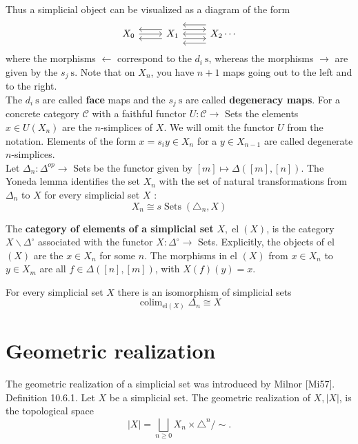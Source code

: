 Thus a simplicial object can be visualized as a diagram of the form
$$
\begin{tikzcd}
     X_0 \ar[r] \ar[r, leftarrow, shift left =2] \ar[r, leftarrow, shift right =2] & X_1 \ar[r, leftarrow] \ar[r, leftarrow, shift left =4] \ar[r, leftarrow, shift right =4] \ar[r, shift left =2] \ar[r, shift right =2] & X_2  \cdots
    \end{tikzcd}
$$
where the morphisms $\leftarrow$ correspond to the $d_i \mathrm{~s}$, whereas the morphisms $\rightarrow$ are given by the $s_j \mathrm{~s}$. Note that on $X_n$, you have $n+1$ maps going out to the left and to the right.\\
The $d_i \mathrm{~s}$ are called \textbf{face} maps and the $s_j \mathrm{~s}$ are called \textbf{degeneracy maps}.
For a concrete category $\mathcal{C}$ with a faithful functor $U: \mathcal{C} \rightarrow$ Sets the elements $x \in U\left(X_n\right)$ are the $n$-simplices of $X$. We will omit the functor $U$ from the notation. Elements of the form $x=s_i y \in X_n$ for a $y \in X_{n-1}$ are called degenerate $n$-simplices.\\

Let $\Delta_n: \Delta^{o p} \rightarrow$ Sets be the functor given by $[m] \mapsto \Delta([m],[n])$.
The Yoneda lemma identifies the set $X_n$ with the set of natural transformations from $\Delta_n$ to $X$ for every simplicial set $X$ :
$$
X_n \cong s \operatorname{Sets}\left(\triangle_n, X\right)
$$

The \textbf{category of elements of a simplicial set} $X, \operatorname{el}(X)$, is the category $X \backslash \Delta^{\circ}$ associated with the functor $X: \Delta^{\circ} \rightarrow$ Sets. Explicitly, the objects of el $(X)$ are the $x \in X_n$ for some $n$. The morphisms in el $(X)$ from $x \in X_n$ to $y \in X_m$ are all $f \in \Delta([n],[m])$, with $X(f)(y)=x$.

\begin{prop}
For every simplicial set $X$ there is an isomorphism of simplicial sets
$$
\operatorname{colim}_{\mathrm{el}(X)} \Delta_n \cong X
$$
\end{prop}

\section{Geometric realization}

The geometric realization of a simplicial set was introduced by Milnor [Mi57].
Definition 10.6.1. Let $X$ be a simplicial set. The geometric realization of $X,|X|$, is the topological space
$$
|X|=\bigsqcup_{n \geq 0} X_n \times \triangle^n / \sim .
$$


